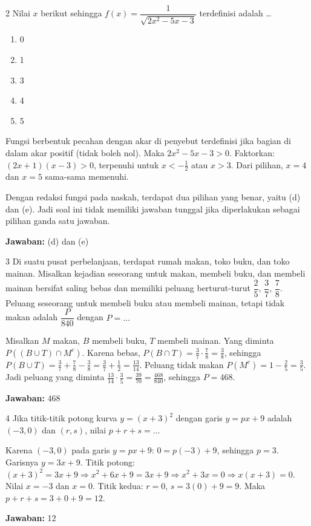 \documentclass[11pt]{article}
\newenvironment{pil}{\begin{enumerate}[label=(\alph*),leftmargin=*,itemsep=1pt,topsep=3pt]}{\end{enumerate}}
\newcommand{\jw}[1]{\par\smallskip\noindent\textbf{Jawaban:} #1}
\begin{document}
\begin{soalbox}{2}
Nilai $x$ berikut sehingga $f(x)=\dfrac{1}{\sqrt{2x^2-5x-3}}$ terdefinisi adalah \ldots
\begin{pil}\item 0 \item 1 \item 3 \item 4 \item 5\end{pil}
\end{soalbox}
\begin{pembox}
Fungsi berbentuk pecahan dengan akar di penyebut terdefinisi jika bagian di dalam akar positif (tidak boleh nol). Maka $2x^2-5x-3>0$. Faktorkan: $(2x+1)(x-3)>0$, terpenuhi untuk $x<-\tfrac{1}{2}$ atau $x>3$. Dari pilihan, $x=4$ dan $x=5$ sama-sama memenuhi.
\begin{catatanbox}
Dengan redaksi fungsi pada naskah, terdapat dua pilihan yang benar, yaitu (d) dan (e). Jadi soal ini tidak memiliki jawaban tunggal jika diperlakukan sebagai pilihan ganda satu jawaban.
\end{catatanbox}
\jw{(d) dan (e)}
\end{pembox}

\begin{soalbox}{3}
Di suatu pusat perbelanjaan, terdapat rumah makan, toko buku, dan toko mainan. Misalkan kejadian seseorang untuk makan, membeli buku, dan membeli mainan bersifat saling bebas dan memiliki peluang berturut-turut $\dfrac{2}{5}$, $\dfrac{3}{7}$, $\dfrac{7}{8}$. Peluang seseorang untuk membeli buku atau membeli mainan, tetapi tidak makan adalah $\dfrac{P}{840}$ dengan $P=\ldots$
\end{soalbox}
\begin{pembox}
Misalkan $M$ makan, $B$ membeli buku, $T$ membeli mainan. Yang diminta $P((B\cup T)\cap M^c)$. Karena bebas, $P(B\cap T)=\tfrac{3}{7}\cdot\tfrac{7}{8}=\tfrac{3}{8}$, sehingga $P(B\cup T)=\tfrac{3}{7}+\tfrac{7}{8}-\tfrac{3}{8}=\tfrac{3}{7}+\tfrac{1}{2}=\tfrac{13}{14}$. Peluang tidak makan $P(M^c)=1-\tfrac{2}{5}=\tfrac{3}{5}$. Jadi peluang yang diminta $\tfrac{13}{14}\cdot\tfrac{3}{5}=\tfrac{39}{70}=\tfrac{468}{840}$, sehingga $P=468$.
\jw{468}
\end{pembox}

\begin{soalbox}{4}
Jika titik-titik potong kurva $y=(x+3)^2$ dengan garis $y=px+9$ adalah $(-3,0)$ dan $(r,s)$, nilai $p+r+s=\ldots$
\end{soalbox}
\begin{pembox}
Karena $(-3,0)$ pada garis $y=px+9$: $0=p(-3)+9$, sehingga $p=3$. Garisnya $y=3x+9$. Titik potong: $(x+3)^2=3x+9\Rightarrow x^2+6x+9=3x+9\Rightarrow x^2+3x=0\Rightarrow x(x+3)=0$. Nilai $x=-3$ dan $x=0$. Titik kedua: $r=0$, $s=3(0)+9=9$. Maka $p+r+s=3+0+9=12$.
\jw{12}
\end{pembox}
\end{document}
